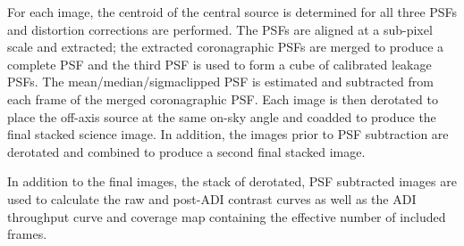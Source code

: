 For each image, the centroid of the central source is determined for all three PSFs and distortion corrections are performed. The PSFs are aligned at a sub-pixel scale and extracted; the extracted coronagraphic PSFs are merged to produce a complete PSF and the third PSF is used to form a cube of calibrated leakage PSFs.
The mean/median/sigmaclipped PSF is estimated and subtracted from each frame of the merged coronagraphic PSF. Each image is
then derotated to place the off-axis source at the same on-sky angle and coadded to produce the final stacked science image. In addition, the images prior to PSF subtraction are derotated and combined to produce a second final stacked image.

In addition to the final images, the stack of derotated, PSF subtracted images are used to calculate the raw and post-ADI contrast curves as well as the ADI throughput curve and coverage map containing the effective number of included frames.



